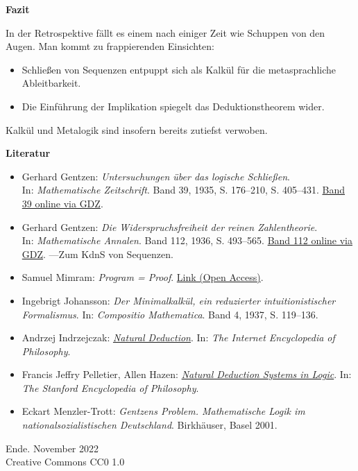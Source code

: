 \documentclass[8pt]{beamer}
\newcommand{\modest}[1]{{\small\color{gray}#1}}
\newcommand{\strong}[1]{\textsf{\textbf{#1}}}
\newcommand{\centerheadline}[1]{%
  \begin{center}\strong{#1}\end{center}}
\newcommand{\parspace}{\vspace{0.8em}}
\begin{document}
\begin{frame}
\centerheadline{Fazit}
\end{frame}

\begin{frame}
In der Retrospektive fällt es einem nach einiger Zeit wie
Schuppen von den Augen. Man kommt zu frappierenden Einsichten:
\begin{itemize}
\item Schließen von Sequenzen entpuppt sich als Kalkül für die metasprachliche Ableitbarkeit.\\
\item Die Einführung der Implikation spiegelt das Deduktionstheorem wider.
\end{itemize}

\parspace
Kalkül und Metalogik sind insofern bereits zutiefst verwoben.
\end{frame}

\begin{frame}[t]
\vspace{2em}
\strong{Literatur}
\begin{itemize}
\item Gerhard Gentzen: \emph{Untersuchungen über das logische Schließen}.\\
In: \emph{Mathematische Zeitschrift}. Band 39, 1935, S. 176--210, S. 405--431.
\href{https://gdz.sub.uni-goettingen.de/id/PPN266833020_0039}{Band 39 online via GDZ}.
\item Gerhard Gentzen: \emph{Die Widerspruchsfreiheit der reinen
Zahlentheorie}.\\
In: \emph{Mathematische Annalen}. Band 112, 1936, S. 493--565.
\href{https://gdz.sub.uni-goettingen.de/id/PPN235181684_0112}{Band 112 online via GDZ}.
---Zum KdnS von Sequenzen.
\item Samuel Mimram: \emph{Program = Proof}.
\href{https://www.lix.polytechnique.fr/Labo/Samuel.Mimram/publications/}{Link (Open Access)}.
\item Ingebrigt Johansson: \emph{Der Minimalkalkül, ein reduzierter
intuitionistischer Formalismus}. In: \emph{Compositio Mathematica}.
Band 4, 1937, S. 119--136.
\item Andrzej Indrzejczak: \href{https://iep.utm.edu/natural-deduction/}{\emph{Natural Deduction}}.
In: \emph{The Internet Encyclopedia of Philosophy}.
\item Francis Jeffry Pelletier, Allen Hazen:
\href{https://plato.stanford.edu/entries/natural-deduction/}{\emph{Natural Deduction Systems in Logic}}.
In: \emph{The Stanford Encyclopedia of Philosophy}.
\item Eckart Menzler-Trott: \emph{Gentzens Problem. Mathematische Logik
  im nationalsozialistischen Deutschland}. Birkhäuser, Basel 2001.
\end{itemize}
\end{frame}

\begin{frame}
Ende.
\vfill\hfill\modest{November 2022}\\
\hfill\modest{Creative Commons CC0 1.0}
\end{frame}
\end{document}
